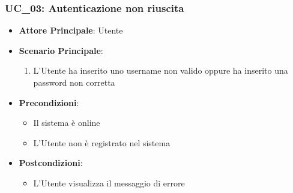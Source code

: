 \subsubsection{UC\_03: Autenticazione non riuscita}
\label{uc_03}

\begin{itemize}
    \item \textbf{Attore Principale}: Utente
    \item \textbf{Scenario Principale}:
    \begin{enumerate}
        \item L'Utente ha inserito uno username non valido oppure ha inserito una password non corretta
    \end{enumerate}
    \item \textbf{Precondizioni}:
    \begin{itemize}
        \item Il sistema è online
        \item L'Utente non è registrato nel sistema
    \end{itemize}
    \item \textbf{Postcondizioni}:
    \begin{itemize}
        \item L'Utente visualizza il messaggio di errore 
    \end{itemize}
\end{itemize}